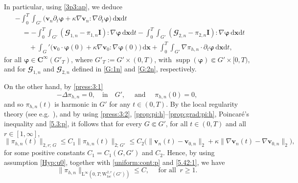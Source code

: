 \documentclass[12pt,reqno]{amsart}
\numberwithin{equation}{section}
\theoremstyle{definition}
\def\dx{\,\mathrm{d}\boldsymbol{x}}
\def\dxt{\,\mathrm{d}\boldsymbol{x}\mathrm{d}t}
\def\supp{\operatorname{supp}}
\def\W{\mathrm{W}}
\def\loc{\mathrm{loc}}
\def\L{\mathrm{L}}
\def\vv{\boldsymbol{v}}
\def\bfC{\mathbf{C}}
\def\bfI{\mathbf{I}}
\def\bfi{\boldsymbol{\varphi}}
\def\bcG{\mathbfcal{G}}
\begin{document}
{In particular, using \eqref{3p3:ap}, we deduce
\begin{equation}\label{5.49}
\begin{split}
&
-\!\int_{0}^{T}\!\!\!\!\int_{G'}\big(\vv_n{\partial_t\bfi} +\kappa\nabla\vv_n:\nabla{\partial_t\bfi}\big)\dxt
\\
& \quad =-
\!\int_{0}^{T}\!\!\!\!\int_{G'}(\bcG_{1,n}-\pi_{1,n}\bfI):\nabla \bfi  \dxt
-
\!\int_{0}^{T}\!\!\!\!\int_{G'} (\bcG_{2,n}-\pi_{2,n}\bfI ): \nabla\bfi \dxt
\\
&\qquad
 + \int_G'\big(\vv_{0}\cdot\bfi(0)+\kappa\nabla\vv_{0}:\nabla\bfi(0)\big)\dx +\!\int_{0}^{T}\!\!\!\!\int_{G'}\nabla\pi_{h,n}\cdot{\partial_t\bfi}\dxt,
\end{split}
\end{equation}
for all $\bfi \in \bfC^\infty(G'_T)$, where $G'_T:=G'\times (0,T)$, with $\supp(\bfi)\Subset G'\times[0,T)$, {and for $\bcG_{1,n}$ and $\bcG_{2,n}$ defined in \eqref{G:1n} and \eqref{G:2n}, respectively.}

On the other hand, {by \eqref{press:3:1}
\begin{equation}\label{press:3:h}
-\Delta \pi_{h,n}=0,\quad \mbox{in}\quad G',\quad \text{ and } \quad  \pi_{h,n}(0)=0,
\end{equation}
and so $\pi_{h,n}(t)$ is harmonic in $G'$ for any $t\in(0,T)$.}
By the local regularity theory (see
e.g.~\cite[Theorem~8.24]{GT:1998}), {and by using \eqref{press:3:2}, \eqref{prop:pi:h}--\eqref{prop:grad:pi:h}, Poincar\'e's inequality and \eqref{5.3:p}, it follows} that for every $G\Subset G'$, for all $t\in(0,T)$ and all $r\in[1,\infty]$,
\begin{equation*}
\|\pi_{h,n}(t)\|_{2,r;\,G}\leq C_1\|\pi_{h,n}(t)\|_{2;\,G'}\leq C_2\big(\|\vv_n(t)-\vv_{0,n}\|_2+\kappa\|\nabla\vv_n(t)-\nabla\vv_{0,n}\|_2\big),
\end{equation*}
for some positive constants $C_1=C_1(G,G')$ and $C_2$.
Hence, by using assumption \eqref{Hyp:u0}, {together with \eqref{uniform:cont:p}} and \eqref{5.42:1}, we have
\begin{equation}\label{5.57}
\|\pi_{h,n}\|_{\L^\infty(0,T;\W^{2,r}_\loc(G'))}\leq C,\quad \text{ for all }\  r\geq 1.
\end{equation}

}
\end{document}
